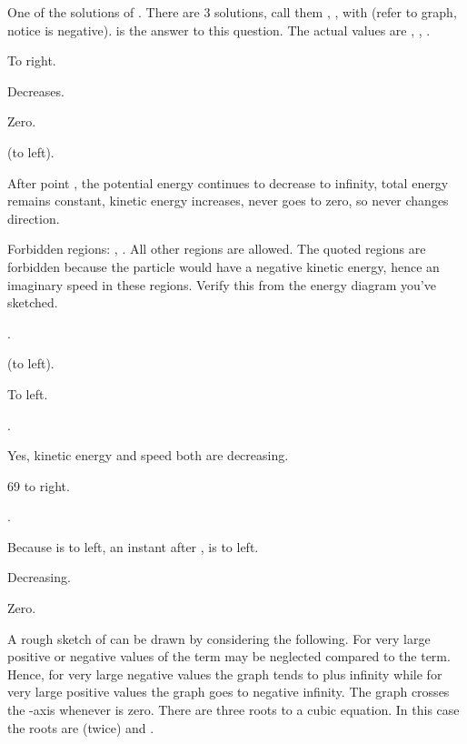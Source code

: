 {\newpage

\BriefAns

\begin{two-digit-list}
\item [1.] One of the solutions of .
There are 3 solutions, call them , ,  with
 (refer to graph, notice  is negative).
 is the answer to this question.
The actual values are , , .
\item [2.] To right.
\item [3.] Decreases.
\item [4.] Zero.
\item [5.]  (to left).
\item [6.] After point , the potential energy continues to decrease
to infinity, total energy remains constant, kinetic energy increases, never
 goes to zero, so  never changes direction.
\item [7.] Forbidden regions: , .
All other regions are allowed.
The quoted regions are forbidden because the particle would have a negative
kinetic energy, hence an imaginary speed in these regions.
Verify this from the energy diagram you've sketched.
\item [8.] .
\item [9.]  (to left).
\item [10.] To left.
\item [11.] .
\item [12.] Yes, kinetic energy and speed both are decreasing.
\item [13.] 69 to right.
\item [14.] .
\item [15.] Because  is to left, an instant after ,  is to
left.
\item [16.] Decreasing.
\item [17.] Zero.
\item [18.] A rough sketch of  can be drawn by considering the
following.
For very large positive or negative values of  the  term may be
neglected compared to the  term.
Hence, for very large negative values the graph tends to plus infinity while
for very large positive values the graph goes to negative infinity.
The graph crosses the -axis whenever  is zero.
There are three roots to a cubic equation.
In this case the roots are  (twice) and .

\end{two-digit-list}}
